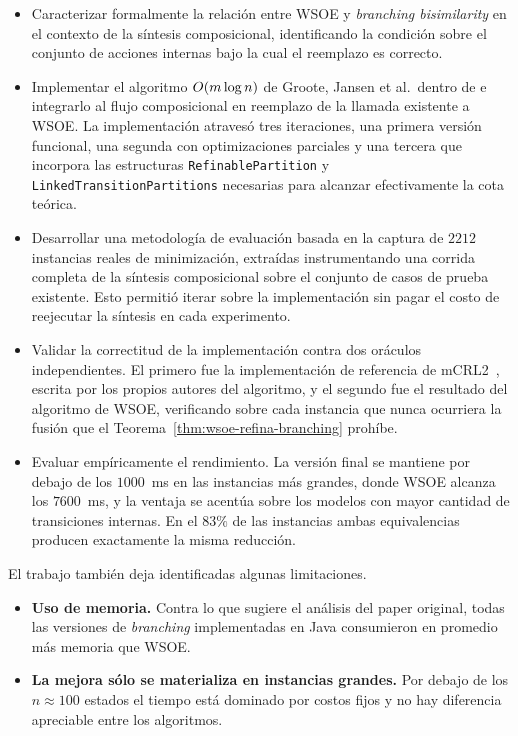 \begin{itemize}
    \item Caracterizar formalmente la relación entre WSOE y \textit{branching bisimilarity} en
    el contexto de la síntesis composicional, identificando la condición sobre el conjunto de
    acciones internas bajo la cual el reemplazo es correcto.

    \item Implementar el algoritmo ${O\!\left(m \log n\right)}$ de Groote, Jansen et al.\ dentro de \MTSA{}
    \cite{mtsa} e integrarlo al flujo composicional en reemplazo de la llamada existente a
    WSOE. La implementación atravesó tres iteraciones, una primera versión funcional, una
    segunda con optimizaciones parciales y una tercera que incorpora las estructuras
    \texttt{RefinablePartition} y \texttt{LinkedTransitionPartitions} necesarias para alcanzar
    efectivamente la cota teórica.

    \item Desarrollar una metodología de evaluación basada en la captura de $2212$ instancias
    reales de minimización, extraídas instrumentando una corrida completa de la síntesis
    composicional sobre el conjunto de casos de prueba existente. Esto permitió iterar sobre la
    implementación sin pagar el costo de reejecutar la síntesis en cada experimento.

    \item Validar la correctitud de la implementación contra dos oráculos independientes. El
    primero fue la implementación de referencia de mCRL2~\cite{mcrl2}, escrita por los propios
    autores del algoritmo, y el segundo fue el resultado del algoritmo de WSOE, verificando
    sobre cada instancia que nunca
    ocurriera la fusión que el Teorema~\ref{thm:wsoe-refina-branching} prohíbe.

    \item Evaluar empíricamente el rendimiento. La versión final se mantiene por debajo de los
    $1000$~ms en las instancias más grandes, donde WSOE alcanza los $7600$~ms, y la ventaja se
    acentúa sobre los modelos con mayor cantidad de transiciones internas. En el $83\%$ de las
    instancias ambas equivalencias producen exactamente la misma reducción.
\end{itemize}

\vspace{.5cm}
El trabajo también deja identificadas algunas limitaciones.

\begin{itemize}
    \item \textbf{Uso de memoria.} Contra lo que sugiere el análisis del paper original, todas
    las versiones de \textit{branching} implementadas en Java consumieron en promedio más memoria que WSOE. 

    \item \textbf{La mejora sólo se materializa en instancias grandes.} Por debajo de los
    $n \approx 100$ estados el tiempo está dominado por costos fijos y no hay diferencia
    apreciable entre los algoritmos.
\end{itemize}

